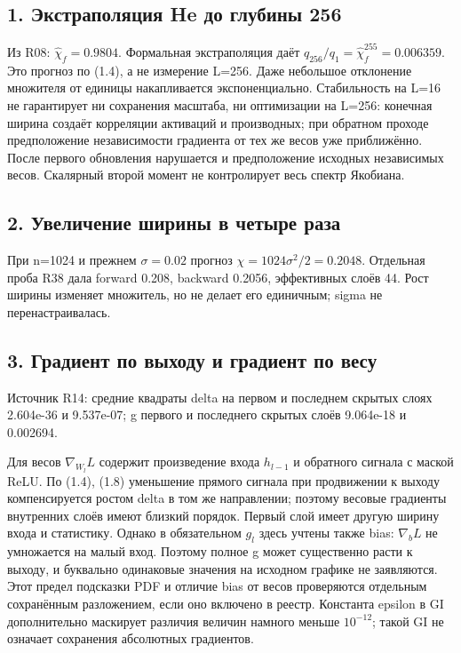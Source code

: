 \documentclass[10pt,a4paper]{article}
\begin{document}
\subsection*{1. Экстраполяция He до глубины 256}

Из R08: $\hat\chi_f=0.9804$. Формальная экстраполяция даёт $q_{256}/q_1=\hat\chi_f^{255}=0.006359$. Это прогноз по (1.4), а не измерение L=256. Даже небольшое отклонение множителя от единицы накапливается экспоненциально. Стабильность на L=16 не гарантирует ни сохранения масштаба, ни оптимизации на L=256: конечная ширина создаёт корреляции активаций и производных; при обратном проходе предположение независимости градиента от тех же весов уже приближённо. После первого обновления нарушается и предположение исходных независимых весов. Скалярный второй момент не контролирует весь спектр Якобиана.

\subsection*{2. Увеличение ширины в четыре раза}

При n=1024 и прежнем $\sigma=0.02$ прогноз $\chi=1024\sigma^2/2=0.2048$. Отдельная проба R38 дала forward 0.208, backward 0.2056, эффективных слоёв 44. Рост ширины изменяет множитель, но не делает его единичным; sigma не перенастраивалась.

\subsection*{3. Градиент по выходу и градиент по весу}

Источник R14: средние квадраты delta на первом и последнем скрытых слоях 2.604e-36 и 9.537e-07; g первого и последнего скрытых слоёв 9.064e-18 и 0.002694.

Для весов $\nabla_{W_l}L$ содержит произведение входа $h_{l-1}$ и обратного сигнала с маской ReLU. По (1.4), (1.8) уменьшение прямого сигнала при продвижении к выходу компенсируется ростом delta в том же направлении; поэтому весовые градиенты внутренних слоёв имеют близкий порядок. Первый слой имеет другую ширину входа и статистику. Однако в обязательном $g_l$ здесь учтены также bias: $\nabla_bL$ не умножается на малый вход. Поэтому полное g может существенно расти к выходу, и буквально одинаковые значения на исходном графике не заявляются. Этот предел подсказки PDF и отличие bias от весов проверяются отдельным сохранённым разложением, если оно включено в реестр. Константа epsilon в GI дополнительно маскирует различия величин намного меньше $10^{-12}$; такой GI не означает сохранения абсолютных градиентов.
\end{document}
